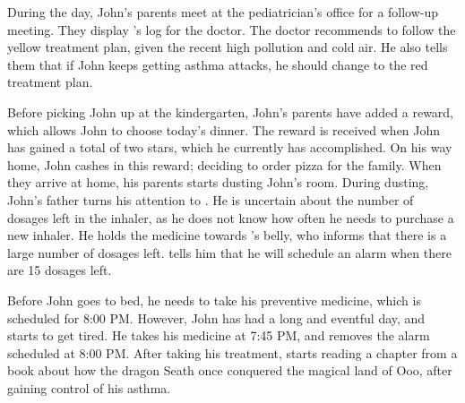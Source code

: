 During the day, John's parents meet at the pediatrician's office for a follow-up meeting. They display \app{}'s log for the doctor. The doctor recommends to follow the yellow treatment plan, given the recent high pollution and cold air. He also tells them that if John keeps getting asthma attacks, he should change to the red treatment plan.

Before picking John up at the kindergarten, John's parents have added a reward, which allows John to choose today's dinner. The reward is received when John has gained a total of two stars, which he currently has accomplished. On his way home, John cashes in this reward; deciding to order pizza for the family. When they arrive at home, his parents starts dusting John's room. During dusting, John's father turns his attention to \buddy{}. He is uncertain about the number of dosages left in the inhaler, as he does not know how often he needs to purchase a new inhaler. He holds the medicine towards \buddy{}'s belly, who informs that there is a large number of dosages left. \buddy{} tells him that he will schedule an alarm when there are 15 dosages left. 

Before John goes to bed, he needs to take his preventive medicine, which is scheduled for 8:00 PM. However, John has had a long and eventful day, and starts to get tired. He takes his medicine at 7:45 PM, and \buddy{} removes the alarm scheduled at 8:00 PM. After taking his treatment, \buddy{} starts reading a chapter from a book about how the dragon Seath once conquered the magical land of Ooo, after gaining control of his asthma. 